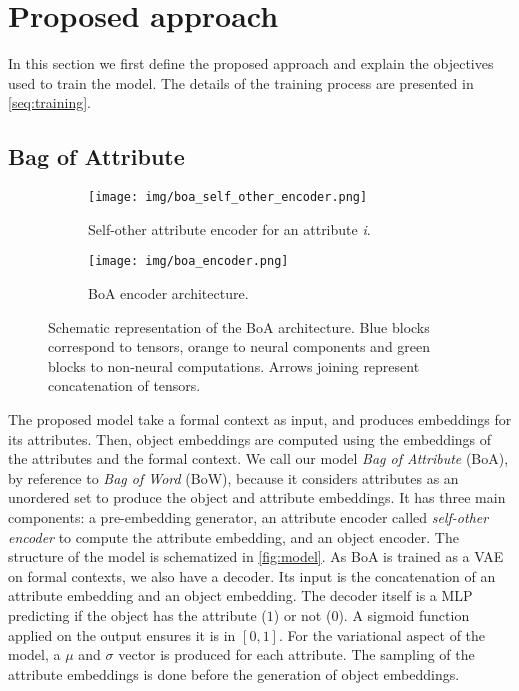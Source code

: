 \section{Proposed approach}\label{seq:model}
In this section we first define the proposed approach and explain the objectives used to train the model.
%
The details of the training process are presented in \autoref{seq:training}.

\subsection{Bag of Attribute}
\begin{figure}[t]
\begin{subfigure}{.57\textwidth}\centering
    \texttt{[image: img/boa\_self\_other\_encoder.png]}  
    \caption{Self-other attribute encoder for an attribute \textit{i}.}\label{fig:self-other}
\end{subfigure}
\begin{subfigure}{.42\textwidth}\centering
    \texttt{[image: img/boa\_encoder.png]}  
    \caption{BoA encoder architecture.}\label{fig:encoder}
\end{subfigure}
\caption{Schematic representation of the BoA architecture. Blue blocks correspond to tensors, orange to neural components and green blocks to non-neural computations. Arrows joining represent concatenation of tensors.} \label{fig:model}
\end{figure}

The proposed model take a formal context as input, and produces embeddings for its attributes.
Then, object embeddings are computed using the embeddings of the attributes and the formal context.
We call our model \textit{Bag of Attribute} (BoA), by reference to \textit{Bag of Word} (BoW), because it considers attributes as an unordered set to produce the object and attribute embeddings.
It has three main components: a pre-embedding generator, an attribute encoder called \textit{self-other encoder} to compute the attribute embedding, and an object encoder. 
The structure of the model is schematized in \autoref{fig:model}.
%
As BoA is trained as a VAE on formal contexts, we also have a decoder.
%
Its input is the concatenation of an attribute embedding and an object embedding.
The decoder itself is a MLP predicting if the object has the attribute ($1$) or not ($0$).
A sigmoid function applied on the output ensures it is in $[0,1]$.
%
For the variational aspect of the model, a $\mu$ and $\sigma$ vector is produced for each attribute.
The sampling of the attribute embeddings is done before the generation of object embeddings.



